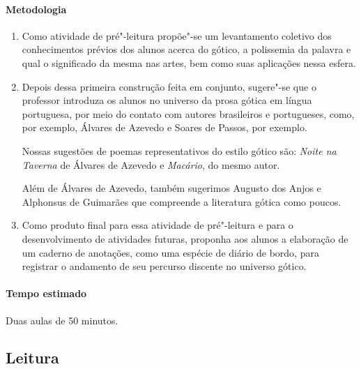 \documentclass[12pt]{extarticle}
\begin{document}
\paragraph{Metodologia}

\begin{enumerate}
\item
Como atividade de pré"-leitura propõe"-se um levantamento coletivo dos
conhecimentos prévios dos alunos acerca do gótico, a polissemia da palavra e qual o
significado da mesma nas artes, bem como suas aplicações nessa esfera.

\item
Depois dessa primeira construção feita em conjunto, sugere"-se que o professor introduza 
os alunos no universo da prosa gótica em língua portuguesa, por meio do contato com
autores brasileiros e portugueses, como, por exemplo, Álvares de Azevedo
e Soares de Passos, por exemplo. 

Nossas sugestões de poemas representativos do estilo gótico são: \emph{Noite na Taverna} 
de Álvares de Azevedo e \emph{Macário}, do mesmo autor.

Além de Álvares de Azevedo, também sugerimos Augusto dos Anjos e
Alphonsus de Guimarães que compreende a literatura gótica como poucos.



\item
Como produto final para essa atividade de pré"-leitura e para o desenvolvimento de atividades 
futuras, proponha aos alunos a elaboração de um caderno de anotações, como uma espécie de diário de bordo, 
para registrar o andamento de seu percurso discente no universo gótico.

\end{enumerate}

\paragraph{Tempo estimado} Duas aulas de 50 minutos. 

\subsection{Leitura}  
\end{document}
